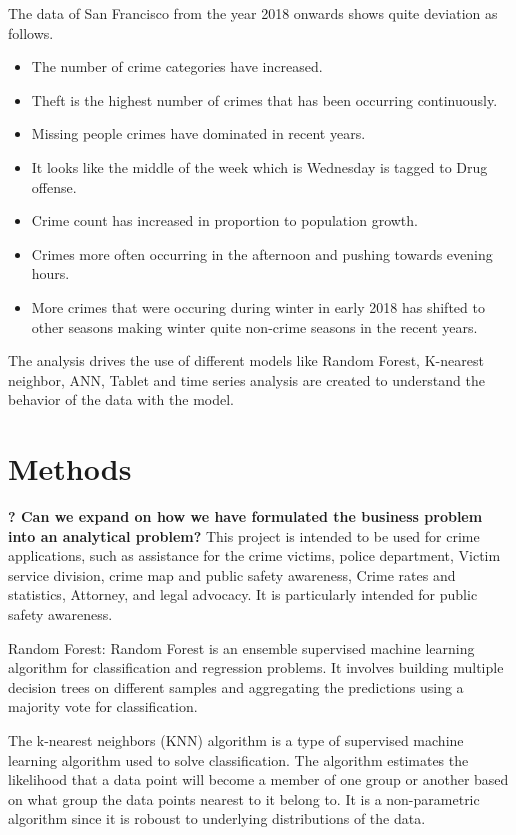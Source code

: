 \documentclass[conference,final,]{IEEEtran}
\providecommand{\tightlist}{%
  \setlength{\itemsep}{0pt}\setlength{\parskip}{0pt}}
\begin{document}
The data of San Francisco from the year 2018 onwards shows quite
deviation as follows.

\begin{itemize}
\tightlist
\item
  The number of crime categories have increased.
\item
  Theft is the highest number of crimes that has been occurring
  continuously.
\item
  Missing people crimes have dominated in recent years.
\item
  It looks like the middle of the week which is Wednesday is tagged to
  Drug offense.
\item
  Crime count has increased in proportion to population growth.
\item
  Crimes more often occurring in the afternoon and pushing towards
  evening hours.
\item
  More crimes that were occuring during winter in early 2018 has shifted
  to other seasons making winter quite non-crime seasons in the recent
  years.
\end{itemize}

The analysis drives the use of different models like Random Forest,
K-nearest neighbor, ANN, Tablet and time series analysis are created to
understand the behavior of the data with the model.

\section{Methods}\label{methods}

\textbf{? Can we expand on how we have formulated the business problem
into an analytical problem?} This project is intended to be used for
crime applications, such as assistance for the crime victims, police
department, Victim service division, crime map and public safety
awareness, Crime rates and statistics, Attorney, and legal advocacy. It
is particularly intended for public safety awareness.

Random Forest: Random Forest is an ensemble supervised machine learning
algorithm for classification and regression problems. It involves
building multiple decision trees on different samples and aggregating
the predictions using a majority vote for classification.

The k-nearest neighbors (KNN) algorithm is a type of supervised machine
learning algorithm used to solve classification. The algorithm estimates
the likelihood that a data point will become a member of one group or
another based on what group the data points nearest to it belong to. It
is a non-parametric algorithm since it is roboust to underlying
distributions of the data.
\end{document}
